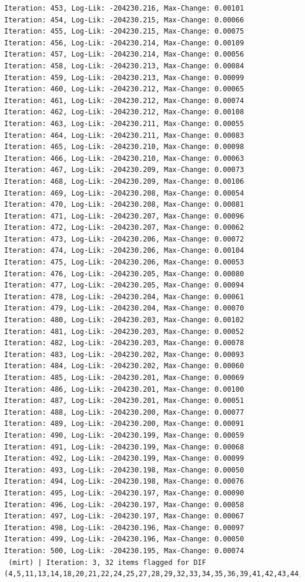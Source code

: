 \documentclass[
  letterpaper,
  DIV=11,
  numbers=noendperiod]{scrreport}
\begin{document}
\begin{verbatim}
Iteration: 453, Log-Lik: -204230.216, Max-Change: 0.00101
Iteration: 454, Log-Lik: -204230.215, Max-Change: 0.00066
Iteration: 455, Log-Lik: -204230.215, Max-Change: 0.00075
Iteration: 456, Log-Lik: -204230.214, Max-Change: 0.00109
Iteration: 457, Log-Lik: -204230.214, Max-Change: 0.00056
Iteration: 458, Log-Lik: -204230.213, Max-Change: 0.00084
Iteration: 459, Log-Lik: -204230.213, Max-Change: 0.00099
Iteration: 460, Log-Lik: -204230.212, Max-Change: 0.00065
Iteration: 461, Log-Lik: -204230.212, Max-Change: 0.00074
Iteration: 462, Log-Lik: -204230.212, Max-Change: 0.00108
Iteration: 463, Log-Lik: -204230.211, Max-Change: 0.00055
Iteration: 464, Log-Lik: -204230.211, Max-Change: 0.00083
Iteration: 465, Log-Lik: -204230.210, Max-Change: 0.00098
Iteration: 466, Log-Lik: -204230.210, Max-Change: 0.00063
Iteration: 467, Log-Lik: -204230.209, Max-Change: 0.00073
Iteration: 468, Log-Lik: -204230.209, Max-Change: 0.00106
Iteration: 469, Log-Lik: -204230.208, Max-Change: 0.00054
Iteration: 470, Log-Lik: -204230.208, Max-Change: 0.00081
Iteration: 471, Log-Lik: -204230.207, Max-Change: 0.00096
Iteration: 472, Log-Lik: -204230.207, Max-Change: 0.00062
Iteration: 473, Log-Lik: -204230.206, Max-Change: 0.00072
Iteration: 474, Log-Lik: -204230.206, Max-Change: 0.00104
Iteration: 475, Log-Lik: -204230.206, Max-Change: 0.00053
Iteration: 476, Log-Lik: -204230.205, Max-Change: 0.00080
Iteration: 477, Log-Lik: -204230.205, Max-Change: 0.00094
Iteration: 478, Log-Lik: -204230.204, Max-Change: 0.00061
Iteration: 479, Log-Lik: -204230.204, Max-Change: 0.00070
Iteration: 480, Log-Lik: -204230.203, Max-Change: 0.00102
Iteration: 481, Log-Lik: -204230.203, Max-Change: 0.00052
Iteration: 482, Log-Lik: -204230.203, Max-Change: 0.00078
Iteration: 483, Log-Lik: -204230.202, Max-Change: 0.00093
Iteration: 484, Log-Lik: -204230.202, Max-Change: 0.00060
Iteration: 485, Log-Lik: -204230.201, Max-Change: 0.00069
Iteration: 486, Log-Lik: -204230.201, Max-Change: 0.00100
Iteration: 487, Log-Lik: -204230.201, Max-Change: 0.00051
Iteration: 488, Log-Lik: -204230.200, Max-Change: 0.00077
Iteration: 489, Log-Lik: -204230.200, Max-Change: 0.00091
Iteration: 490, Log-Lik: -204230.199, Max-Change: 0.00059
Iteration: 491, Log-Lik: -204230.199, Max-Change: 0.00068
Iteration: 492, Log-Lik: -204230.199, Max-Change: 0.00099
Iteration: 493, Log-Lik: -204230.198, Max-Change: 0.00050
Iteration: 494, Log-Lik: -204230.198, Max-Change: 0.00076
Iteration: 495, Log-Lik: -204230.197, Max-Change: 0.00090
Iteration: 496, Log-Lik: -204230.197, Max-Change: 0.00058
Iteration: 497, Log-Lik: -204230.197, Max-Change: 0.00067
Iteration: 498, Log-Lik: -204230.196, Max-Change: 0.00097
Iteration: 499, Log-Lik: -204230.196, Max-Change: 0.00050
Iteration: 500, Log-Lik: -204230.195, Max-Change: 0.00074
 (mirt) | Iteration: 3, 32 items flagged for DIF (4,5,11,13,14,18,20,21,22,24,25,27,28,29,32,33,34,35,36,39,41,42,43,44,46,47,48,50,51,52,54,58)
\end{verbatim}
\end{document}
